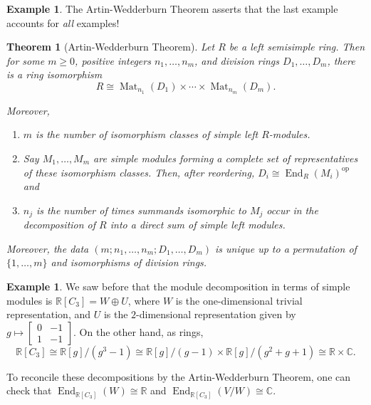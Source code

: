 \documentclass{amsart}[12pt]
\def\End{\operatorname{End}}
\def\Mat{\operatorname{Mat}}
\newcommand{\R}{{\mathbb{R}}}
\newcommand{\C}{\mathbb{C}}
\newcommand{\op}{\mathrm{op}}
\numberwithin{equation}{section}
\theoremstyle{plain} %
\newtheorem{thm}[equation]{Theorem}
\theoremstyle{definition}
\newtheorem{ex}[equation]{Example}
\theoremstyle{remark}
\begin{document}
\begin{ex}
The Artin-Wedderburn Theorem asserts that the last example accounts for {\em all} examples!

\begin{thm}[Artin-Wedderburn Theorem]
\label{thm:AW}
 Let $R$ be a left semisimple ring. Then for some $m \geq 0$, positive integers $n_1, \dots, n_m$,
  and division rings $D_1, \dots, D_m$, there is a ring isomorphism
$$
R \cong \Mat_{n_1}(D_1) \times \cdots \times \Mat_{n_m}(D_m).
$$

Moreover,  
\begin{enumerate}
\item 
$m$ is the number of isomorphism classes of simple left $R$-modules.
\item  Say $M_1, \dots, M_m$  are simple modules forming a complete set of representatives of these  isomorphism classes. Then, after reordering,  $D_i\cong \End_R(M_i)^{\op}$ and
\item  $n_j$ is the number of times summands isomorphic to $M_j$ occur in the decomposition of $R$ into a direct sum of simple left modules.
\end{enumerate}

Moreover, the data $(m; n_1, \dots, n_m; D_1, \dots, D_m)$ is unique up to a permutation of $\{1, \dots, m\}$  and isomorphisms of division rings.
\end{thm}

\begin{ex} We saw before that the module decomposition in terms of simple modules is $\R[C_3] = W \oplus U$, where $W$ is the one-dimensional trivial representation, and $U$ is the $2$-dimensional representation given by $g \mapsto \begin{bmatrix} 0  & -1 \\ 1 & -1\end{bmatrix}$. On the other hand, as rings, 
\[\R[C_3] \cong \R[g]/(g^3-1) \cong \R[g]/(g-1) \times \R[g]/ (g^2+g+1) \cong \R \times \C.\]


To reconcile these decompositions by the Artin-Wedderburn Theorem, one can check that $\End_{\R[C_3]}(W) \cong \R$ and $\End_{\R[C_3]}(V/W) \cong \C$.


\end{ex}
\end{ex}
\end{document}
